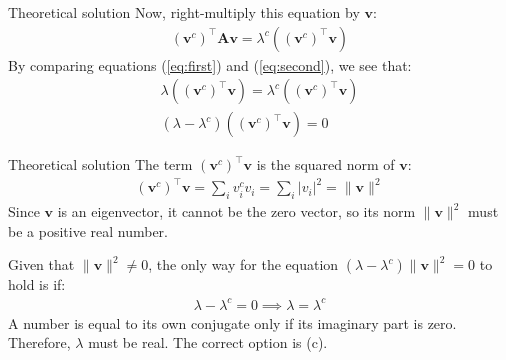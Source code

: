 \documentclass{beamer}
\numberwithin{equation}{section}
\theoremstyle{remark}
\providecommand{\norm}[1]{\lVert#1\rVert}
\let\vec\mathbf
\begin{document}
	\begin{frame}{Theoretical solution}
		Now, right-multiply this equation by $\vec{v}$:
		\begin{align}
			(\vec{v}^c)^\top\vec{A}\vec{v} = \lambda^c((\vec{v}^c)^\top\vec{v}) \label{eq:second}
		\end{align}
		By comparing equations (\ref{eq:first}) and (\ref{eq:second}), we see that:
		\begin{align}
			\lambda((\vec{v}^c)^\top\vec{v}) = \lambda^c((\vec{v}^c)^\top\vec{v}) \\
			(\lambda - \lambda^c)((\vec{v}^c)^\top\vec{v}) = 0
		\end{align}
	\end{frame}
	
	\begin{frame}{Theoretical solution}
		The term $(\vec{v}^c)^\top\vec{v}$ is the squared norm of $\vec{v}$:
		\begin{align}
			(\vec{v}^c)^\top\vec{v} = \sum_{i} v_i^c v_i = \sum_{i} |v_i|^2 = \norm{\vec{v}}^2
		\end{align}
		Since $\vec{v}$ is an eigenvector, it cannot be the zero vector, so its norm $\norm{\vec{v}}^2$ must be a positive real number.
		
		Given that $\norm{\vec{v}}^2 \neq 0$, the only way for the equation $(\lambda - \lambda^c)\norm{\vec{v}}^2 = 0$ to hold is if:
		\begin{align}
			\lambda - \lambda^c = 0 \implies \lambda = \lambda^c
		\end{align}
		A number is equal to its own conjugate only if its imaginary part is zero. Therefore, $\lambda$ must be real. The correct option is (c).
	\end{frame}
	
\end{document}
